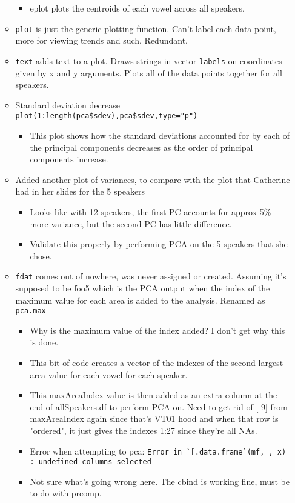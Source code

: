 \documentclass{article}
\begin{document}
\begin{itemize}
\begin{itemize}
\begin{itemize}
            \item eplot plots the centroids of each vowel across all speakers.
        \end{itemize}
        \item \verb|plot| is just the generic plotting function. Can't label each data point, more for viewing trends and such. Redundant.
        \item \verb|text| adds text to a plot. Draws strings in vector \verb|labels| on coordinates given by x and y arguments. Plots all of the data points together for all speakers.
        \item Standard deviation decrease \verb|plot(1:length(pca$sdev),pca$sdev,type="p")|
        \begin{itemize}
            \item This plot shows how the standard deviations accounted for by each of the principal components decreases as the order of principal components increase.
        \end{itemize}
        \item Added another plot of variances, to compare with the plot that Catherine had in her slides for the 5 speakers
        \begin{itemize}
            \item Looks like with 12 speakers, the first PC accounts for approx 5\% more variance, but the second PC has little difference.
            \item Validate this properly by performing PCA on the 5 speakers that she chose.
        \end{itemize}
        \item \verb|fdat| comes out of nowhere, was never assigned or created. Assuming it's supposed to be foo5 which is the PCA output when the index of the maximum value for each area is added to the analysis. Renamed as \verb|pca.max|
        \begin{itemize}
            \item Why is the maximum value of the index added? I don't get why this is done.
            \item This bit of code creates a vector of the indexes of the second largest area value for each vowel for each speaker.
            \item This maxAreaIndex value is then added as an extra column at the end of allSpeakers.df to perform PCA on. Need to get rid of [-9] from maxAreaIndex again since that's VT01 hood and when that row is "ordered", it just gives the indexes 1:27 since they're all NAs.
            \item Error when attempting to pca: \verb|Error in `[.data.frame`(mf, , x) : undefined columns selected|
            \item Not sure what's going wrong here. The cbind is working fine, must be to do with prcomp.
        \end{itemize}
    \end{itemize}
\end{itemize}
\end{document}
